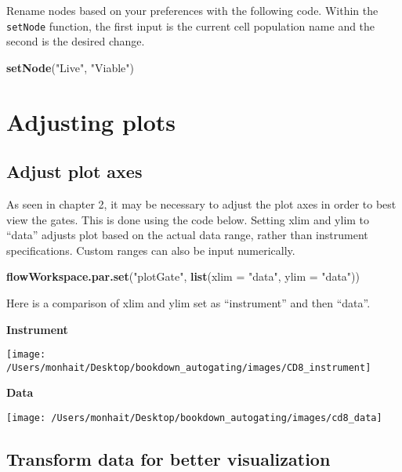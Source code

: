 \documentclass[]{book}
\newenvironment{Shaded}{\begin{snugshade}}{\end{snugshade}}
\newcommand{\DataTypeTok}[1]{\textcolor[rgb]{0.13,0.29,0.53}{#1}}
\newcommand{\KeywordTok}[1]{\textcolor[rgb]{0.13,0.29,0.53}{\textbf{#1}}}
\newcommand{\NormalTok}[1]{#1}
\newcommand{\StringTok}[1]{\textcolor[rgb]{0.31,0.60,0.02}{#1}}
\begin{document}
Rename nodes based on your preferences with the following code. Within the \texttt{setNode} function, the first input is the current cell population name and the second is the desired change.

\begin{Shaded}
\begin{Highlighting}[]
\KeywordTok{setNode}\NormalTok{(}\StringTok{"Live"}\NormalTok{, }\StringTok{"Viable"}\NormalTok{)}
\end{Highlighting}
\end{Shaded}

\hypertarget{adjusting-plots}{%
\section{Adjusting plots}\label{adjusting-plots}}

\hypertarget{adjust-plot-axes}{%
\subsection{Adjust plot axes}\label{adjust-plot-axes}}

As seen in chapter 2, it may be necessary to adjust the plot axes in order to best view the gates. This is done using the code below. Setting xlim and ylim to ``data'' adjusts plot based on the actual data range, rather than instrument specifications. Custom ranges can also be input numerically.

\begin{Shaded}
\begin{Highlighting}[]
\KeywordTok{flowWorkspace.par.set}\NormalTok{(}\StringTok{"plotGate"}\NormalTok{, }\KeywordTok{list}\NormalTok{(}\DataTypeTok{xlim =} \StringTok{"data"}\NormalTok{,}
                                       \DataTypeTok{ylim =} \StringTok{"data"}\NormalTok{))}
\end{Highlighting}
\end{Shaded}

Here is a comparison of xlim and ylim set as ``instrument'' and then ``data''.

\textbf{Instrument}

\texttt{[image: /Users/monhait/Desktop/bookdown\_autogating/images/CD8\_instrument]}

\textbf{Data}

\texttt{[image: /Users/monhait/Desktop/bookdown\_autogating/images/cd8\_data]}

\hypertarget{transform-data-for-better-visualization}{%
\subsection{Transform data for better visualization}\label{transform-data-for-better-visualization}}
\end{document}
